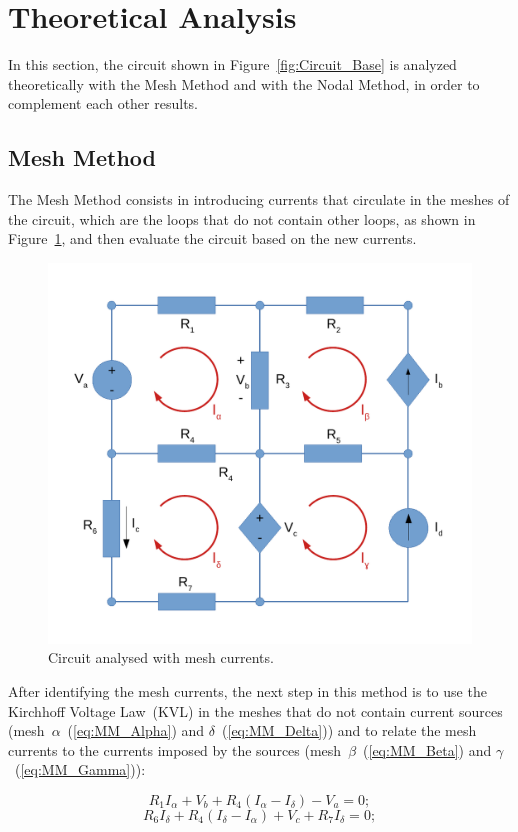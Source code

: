 \section{Theoretical Analysis}
\label{sec:analysis}

In this section, the circuit shown in Figure~\ref{fig:Circuit_Base} is analyzed theoretically with the Mesh Method and with the Nodal Method, in order to complement each other results.

\subsection{Mesh Method}

The Mesh Method consists in introducing currents that circulate in the meshes of the circuit, which are the loops that do not contain other loops, as shown in Figure~\ref{fig:Circuit_Mesh}, and then evaluate the circuit based on the new currents.

\begin{figure}[h] \centering
\includegraphics[width=0.5\linewidth]{CircuitMesh.pdf}
\caption{Circuit analysed with mesh currents.}
\label{fig:Circuit_Mesh}
\end{figure}

After identifying the mesh currents, the next step in this method is to use the Kirchhoff Voltage Law~(KVL) in the meshes that do not contain current sources (mesh~$\alpha$~(\ref{eq:MM_Alpha}) and $\delta$~(\ref{eq:MM_Delta})) and to relate the mesh currents to the currents imposed by the sources (mesh~$\beta$~(\ref{eq:MM_Beta}) and $\gamma$~(\ref{eq:MM_Gamma})):

\begin{equation}
  R_1I_{\alpha} + V_b + R_4(I_{\alpha}-I_{\delta}) - V_a = 0;
  \label{eq:MM_Alpha}
\end{equation}
\begin{equation}
  R_6I_{\delta} + R_4(I_{\delta}-I_{\alpha}) + V_c + R_7I_{\delta} = 0;
  \label{eq:MM_Delta}
\end{equation}

